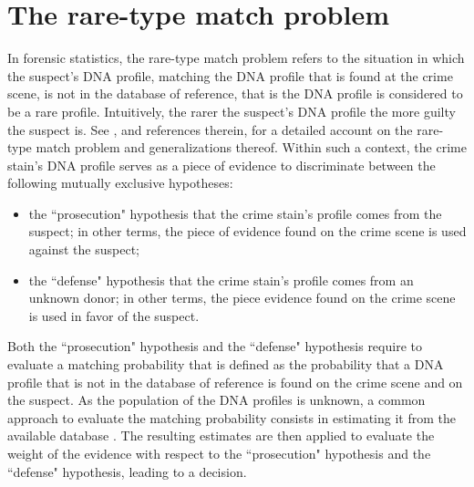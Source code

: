 \documentclass{article}
\newcommand{\1}{\boldsymbol{1}}
\theoremstyle{plain}
\begin{document}

\section{The rare-type match problem}\label{sec3}\label{sec3}

In forensic statistics, the rare-type match problem refers to the situation in which the suspect's DNA profile, matching the DNA profile that is found at the crime scene, is not in the database of reference, that is the DNA profile is considered to be a rare profile. Intuitively, the rarer the suspect's DNA profile the more guilty the suspect is. See \cite{Bre(10)}, and references therein, for a detailed account on the rare-type match problem and generalizations thereof. Within such a context, the crime stain's DNA profile serves as a piece of evidence to discriminate between the following mutually exclusive hypotheses:
\begin{itemize}
\item[i)] the ``prosecution" hypothesis that the crime stain's profile comes from the suspect; in other terms, the piece of evidence found on the crime scene is used against the suspect;
\item[ii)]  the ``defense" hypothesis that the crime stain's profile comes from an unknown donor; in other terms, the piece evidence found on the crime scene is used in favor of the suspect. 
\end{itemize}
Both the ``prosecution" hypothesis and the ``defense" hypothesis require to evaluate a matching probability that is defined as the probability that a DNA profile that is not in the database of reference is found on the crime scene and on the suspect. As the population of the DNA profiles is unknown, a common approach to evaluate the matching probability consists in estimating it from the available database \cite{Bre(10),Cer(17),Cer(20)}. The resulting estimates are then applied to evaluate the weight of the evidence with respect to the ``prosecution" hypothesis and the ``defense" hypothesis, leading to a decision. 
\end{document}
